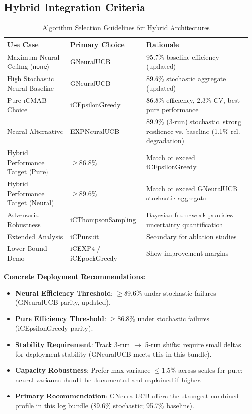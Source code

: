 \documentclass[12pt,a4paper]{article}
\begin{document}
\subsection{Hybrid Integration Criteria}

\begin{table}[H]
\scriptsize
\centering
\caption{Algorithm Selection Guidelines for Hybrid Architectures}
\begin{tabular}{@{}lll@{}}
\toprule
\textbf{Use Case} & \textbf{Primary Choice} & \textbf{Rationale} \\
\midrule
Maximum Neural Ceiling (\texttt{none}) & GNeuralUCB & 95.7\% baseline efficiency (updated) \\
High Stochastic Neural Baseline & GNeuralUCB & 89.6\% stochastic aggregate (updated) \\
Pure iCMAB Choice & iCEpsilonGreedy & 86.8\% efficiency, 2.3\% CV, best pure performance \\
Neural Alternative & EXPNeuralUCB & 89.9\% (3-run) stochastic, strong resilience vs. baseline (1.1\% rel. degradation) \\
Hybrid Performance Target (Pure) & $\geq$86.8\% & Match or exceed iCEpsilonGreedy \\
Hybrid Performance Target (Neural) & $\geq$89.6\% & Match or exceed GNeuralUCB stochastic aggregate \\
Adversarial Robustness & iCThompsonSampling & Bayesian framework provides uncertainty quantification \\
Extended Analysis & iCPursuit & Secondary for ablation studies \\
Lower-Bound Demo & iCEXP4 / iCEpochGreedy & Show improvement margins \\
\bottomrule
\end{tabular}
\end{table}

\textbf{Concrete Deployment Recommendations:}
\begin{itemize}
\item \textbf{Neural Efficiency Threshold}: $\geq$89.6\% under stochastic failures (GNeuralUCB parity, updated).
\item \textbf{Pure Efficiency Threshold}: $\geq$86.8\% under stochastic failures (iCEpsilonGreedy parity).
\item \textbf{Stability Requirement}: Track 3-run $\rightarrow$ 5-run shifts; require small deltas for deployment stability (GNeuralUCB meets this in this bundle).
\item \textbf{Capacity Robustness}: Prefer max variance $\leq$1.5\% across scales for pure; neural variance should be documented and explained if higher.
\item \textbf{Primary Recommendation}: GNeuralUCB offers the strongest combined profile in this log bundle (89.6\% stochastic; 95.7\% baseline).
\end{itemize}
\end{document}
